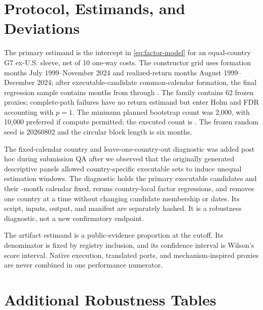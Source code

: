 \documentclass[11pt]{article}
\newcommand{\bps}[1]{\SI{#1}{\text{bp}}}
\begin{document}
\begin{appendices}
\section{Protocol, Estimands, and Deviations}\label{app:protocol}

The primary estimand is the intercept in \cref{eq:factor-model} for an equal-country G7 ex-U.S. sleeve, net of \bps{10} one-way costs. The constructor grid uses formation months July 1999--November 2024 and realized-return months August 1999--December 2024; after executable-candidate common-calendar formation, the final regression sample contains \RegressionMonthCount{} months from \RegressionStartMonth{} through \RegressionEndMonth{}. The family contains 62 frozen proxies; complete-path failures have no return estimand but enter Holm and FDR accounting with $p=1$. The minimum planned bootstrap count was 2,000, with 10,000 preferred if compute permitted; the executed count is \BootstrapCount{}. The frozen random seed is 20260802 and the circular block length is six months. \ProtocolDeviationStatement{}

The fixed-calendar country and leave-one-country-out diagnostic was added post hoc during submission QA after we observed that the originally generated descriptive panels allowed country-specific executable sets to induce unequal estimation windows. The diagnostic holds the \ValidProxyCount{} primary executable candidates and their \RegressionMonthCount{}-month calendar fixed, reruns country-local factor regressions, and removes one country at a time without changing candidate membership or dates. Its script, inputs, output, and manifest are separately hashed. It is a robustness diagnostic, not a new confirmatory endpoint.

The artifact estimand is a public-evidence proportion at the cutoff. Its denominator is fixed by registry inclusion, and its confidence interval is Wilson's score interval. Native execution, translated ports, and mechanism-inspired proxies are never combined in one performance numerator.

\section{Additional Robustness Tables}\label{app:robustness}

\begin{landscape}


\end{landscape}
\end{appendices}
\end{document}
